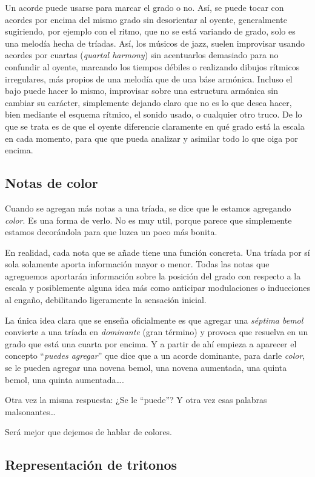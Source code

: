 \documentclass[]{article}
\begin{document}
Un acorde puede usarse para marcar el grado o no. Así, se puede tocar con acordes por encima del mismo grado sin desorientar al oyente, generalmente sugiriendo, por ejemplo con el ritmo, que no se está variando de grado, solo es una melodía hecha de tríadas. Así, los músicos de jazz, suelen improvisar usando acordes por cuartas (\emph{quartal harmony}) sin acentuarlos demasiado para no confundir al oyente, marcando los tiempos débiles o realizando dibujos rítmicos irregulares, más propios de una melodía que de una báse armónica. Incluso el bajo puede hacer lo mismo, improvisar sobre una estructura armónica sin cambiar su carácter, simplemente dejando claro que no es lo que desea hacer, bien mediante el esquema rítmico, el sonido usado, o cualquier otro truco. De lo que se trata es de que el oyente diferencie claramente en qué grado está la escala en cada momento, para que que pueda analizar y asimilar todo lo que oiga por encima.

\subsection{Notas de color}

Cuando se agregan más notas a una tríada, se dice que le estamos agregando \emph{color}. Es una forma de verlo. No es muy util, porque parece que simplemente estamos decorándola para que luzca un poco más bonita.

En realidad, cada nota que se añade tiene una función concreta. Una tríada por sí sola solamente aporta información mayor o menor. Todas las notas que agreguemos aportarán información sobre la posición del grado con respecto a la escala y posiblemente alguna idea más como anticipar modulaciones o inducciones al engaño, debilitando ligeramente la sensación inicial.

La única idea clara que se enseña oficialmente es que agregar una \emph{séptima bemol} convierte a una tríada en \emph{dominante} (gran término) y provoca que resuelva en un grado que está una cuarta por encima. Y a partir de ahí empieza a aparecer el concepto ``\emph{puedes agregar}'' que dice que a un acorde dominante, para darle \emph{color}, se le pueden agregar una novena bemol, una novena aumentada, una quinta bemol, una quinta aumentada\ldots.

Otra vez la misma respuesta: ¿Se le ``puede''? Y otra vez esas palabras malsonantes\ldots{}

Será mejor que dejemos de hablar de colores.

\subsection{Representación de tritonos}
\end{document}
